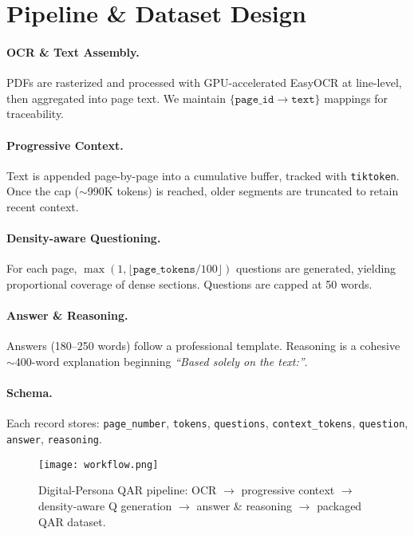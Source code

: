 \documentclass[sigconf,authordraft,anonymous]{acmart}
\begin{document}
\section{Pipeline \& Dataset Design}
\paragraph{OCR \& Text Assembly.}
PDFs are rasterized and processed with GPU-accelerated EasyOCR at line-level, then aggregated into page text. We maintain $\{\texttt{page\_id} \rightarrow \texttt{text}\}$ mappings for traceability.

\paragraph{Progressive Context.}
Text is appended page-by-page into a cumulative buffer, tracked with \texttt{tiktoken}. Once the cap ($\sim$990K tokens) is reached, older segments are truncated to retain recent context.

\paragraph{Density-aware Questioning.}
For each page, $\max(1, \lfloor \texttt{page\_tokens}/100 \rfloor)$ questions are generated, yielding proportional coverage of dense sections. Questions are capped at 50 words.

\paragraph{Answer \& Reasoning.}
Answers (180--250 words) follow a professional template. Reasoning is a cohesive $\sim$400-word explanation beginning \emph{``Based solely on the text:''}.

\paragraph{Schema.}
Each record stores: \texttt{page\_number}, \texttt{tokens}, \texttt{questions}, \texttt{context\_tokens}, \texttt{question}, \texttt{answer}, \texttt{reasoning}.

\begin{figure}[t]
  \centering
  \texttt{[image: workflow.png]}
  \caption{Digital-Persona QAR pipeline: OCR $\rightarrow$ progressive context $\rightarrow$ density-aware Q generation $\rightarrow$ answer \& reasoning $\rightarrow$ packaged QAR dataset.}
  \label{fig:workflow}
\end{figure}
\end{document}
